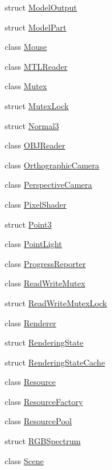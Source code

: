\begin{DoxyCompactItemize}
\item 
struct \hyperlink{structmage_1_1_model_output}{Model\+Output}
\item 
struct \hyperlink{structmage_1_1_model_part}{Model\+Part}
\item 
class \hyperlink{classmage_1_1_mouse}{Mouse}
\item 
class \hyperlink{classmage_1_1_m_t_l_reader}{M\+T\+L\+Reader}
\item 
class \hyperlink{classmage_1_1_mutex}{Mutex}
\item 
struct \hyperlink{structmage_1_1_mutex_lock}{Mutex\+Lock}
\item 
struct \hyperlink{structmage_1_1_normal3}{Normal3}
\item 
class \hyperlink{classmage_1_1_o_b_j_reader}{O\+B\+J\+Reader}
\item 
class \hyperlink{classmage_1_1_orthographic_camera}{Orthographic\+Camera}
\item 
class \hyperlink{classmage_1_1_perspective_camera}{Perspective\+Camera}
\item 
class \hyperlink{classmage_1_1_pixel_shader}{Pixel\+Shader}
\item 
struct \hyperlink{structmage_1_1_point3}{Point3}
\item 
class \hyperlink{classmage_1_1_point_light}{Point\+Light}
\item 
class \hyperlink{classmage_1_1_progress_reporter}{Progress\+Reporter}
\item 
class \hyperlink{classmage_1_1_read_write_mutex}{Read\+Write\+Mutex}
\item 
struct \hyperlink{structmage_1_1_read_write_mutex_lock}{Read\+Write\+Mutex\+Lock}
\item 
class \hyperlink{classmage_1_1_renderer}{Renderer}
\item 
struct \hyperlink{structmage_1_1_rendering_state}{Rendering\+State}
\item 
struct \hyperlink{structmage_1_1_rendering_state_cache}{Rendering\+State\+Cache}
\item 
class \hyperlink{classmage_1_1_resource}{Resource}
\item 
class \hyperlink{classmage_1_1_resource_factory}{Resource\+Factory}
\item 
class \hyperlink{classmage_1_1_resource_pool}{Resource\+Pool}
\item 
struct \hyperlink{structmage_1_1_r_g_b_spectrum}{R\+G\+B\+Spectrum}
\item 
class \hyperlink{classmage_1_1_scene}{Scene}
\item 

\end{DoxyCompactItemize}
